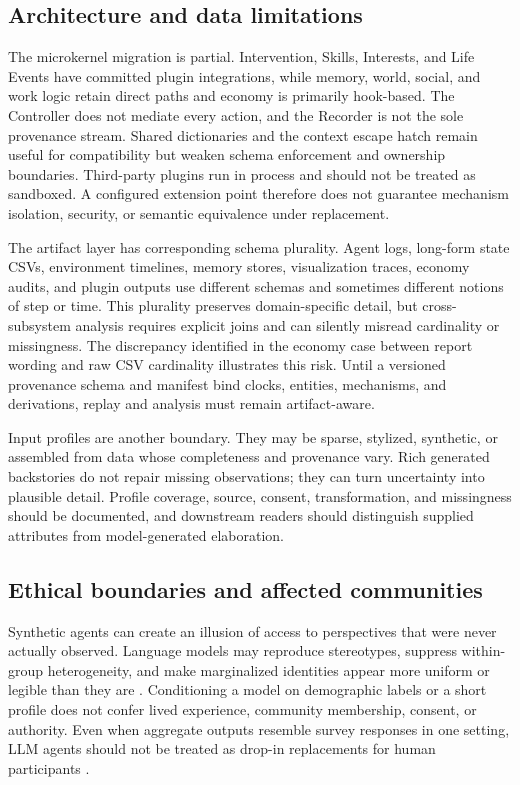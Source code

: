 \subsection{Architecture and data limitations}

The microkernel migration is partial.  Intervention, Skills, Interests, and
Life Events have committed plugin integrations, while memory, world, social, and work
logic retain direct paths and economy is primarily hook-based.  The Controller
does not mediate every action, and the Recorder is not the sole provenance
stream.  Shared dictionaries and the context escape hatch remain useful for
compatibility but weaken schema enforcement and ownership boundaries.
Third-party plugins run in process and should not be treated as sandboxed.  A
configured extension point therefore does not guarantee mechanism isolation,
security, or semantic equivalence under replacement.

The artifact layer has corresponding schema plurality.  Agent logs, long-form
state CSVs, environment timelines, memory stores, visualization traces,
economy audits, and plugin outputs use different schemas and sometimes
different notions of step or time.  This plurality preserves domain-specific
detail, but cross-subsystem analysis requires explicit joins and can silently
misread cardinality or missingness.  The discrepancy identified in the
economy case between report wording and raw CSV cardinality illustrates this
risk.  Until a versioned provenance schema and manifest bind clocks, entities,
mechanisms, and derivations, replay and analysis must remain artifact-aware.

Input profiles are another boundary.  They may be sparse, stylized,
synthetic, or assembled from data whose completeness and provenance vary.
Rich generated backstories do not repair missing observations; they can turn
uncertainty into plausible detail.  Profile coverage, source, consent,
transformation, and missingness should be documented, and downstream readers
should distinguish supplied attributes from model-generated elaboration.

\subsection{Ethical boundaries and affected communities}

Synthetic agents can create an illusion of access to perspectives that were
never actually observed.  Language models may reproduce stereotypes, suppress
within-group heterogeneity, and make marginalized identities appear more
uniform or legible than they are \citep{wang2025flatten}.  Conditioning a model
on demographic labels or a short profile does not confer lived experience,
community membership, consent, or authority.  Even when aggregate outputs
resemble survey responses in one setting, LLM agents should not be treated as
drop-in replacements for human participants \citep{dillion2023replace}.

